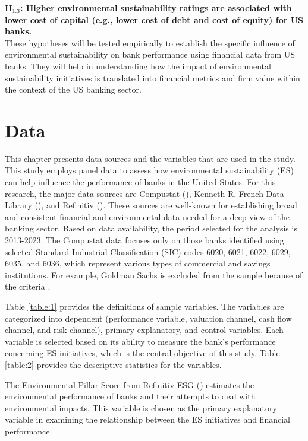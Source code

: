 \documentclass[11pt, a4paper]{article}
\begin{document}
$\mathbf{H_{1.3}}$\textbf{: Higher environmental sustainability ratings are associated with lower cost of capital (e.g., lower cost of debt and cost of equity) for US banks.}\\

These hypotheses will be tested empirically to establish the specific influence of environmental sustainability on bank performance using financial data from US banks. They will help in understanding how the impact of environmental sustainability initiatives is translated into financial metrics and firm value within the context of the US banking sector. 

\newpage
\section{Data}
This chapter presents data sources and the variables that are used in the study. This study employs panel data to assess how environmental sustainability (ES) can help influence the performance of banks in the United States. For this research, the major data sources are Compustat (\citeyear{Compustat2024}), Kenneth R. French Data Library (\citeyear{French2024}), and Refinitiv (\citeyear{Refinitiv2024}). These sources are well-known for establishing broad and consistent financial and environmental data needed for a deep view of the banking sector. Based on data availability, the period selected for the analysis is 2013-2023. The Compustat data focuses only on those banks identified using selected Standard Industrial Classification (SIC) codes 6020, 6021, 6022, 6029, 6035, and 6036, which represent various types of commercial and savings institutions. For example, Goldman Sachs is excluded from the sample because of the criteria \citep{Compustat2024}. 

Table \ref{table:1} provides the definitions of sample variables. The variables are categorized into dependent (performance variable, valuation channel, cash flow channel, and risk channel), primary explanatory, and control variables. Each variable is selected based on its ability to measure the bank's performance concerning ES initiatives, which is the central objective of this study. Table \ref{table:2} provides the descriptive statistics for the variables. 

The Environmental Pillar Score from Refinitiv ESG (\citeyear{Refinitiv2024}) estimates the environmental performance of banks and their attempts to deal with environmental impacts. This variable is chosen as the primary explanatory variable in examining the relationship between the ES initiatives and financial performance. 
\end{document}

